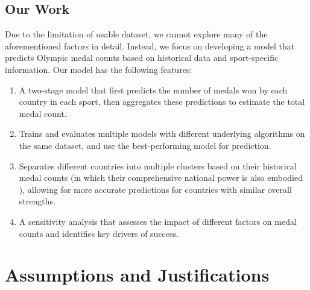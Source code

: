 \documentclass{mcmthesis}
\begin{document}
\subsection{Our Work}

Due to the limitation of usable dataset, we cannot explore many of the aforementioned factors in detail. Instead, we focus on developing a model that predicts Olympic medal counts based on historical data and sport-specific information. Our model has the following features:

\begin{enumerate}
    \item A two-stage model that first predicts the number of medals won by each country in each sport, then aggregates these predictions to estimate the total medal count.
    \item Trains and evaluates multiple models with different underlying algorithms on the same dataset, and use the best-performing model for prediction.
    \item Separates different countries into multiple clusters based on their historical medal counts (in which their comprehensive national power is also embodied \cite{7}), allowing for more accurate predictions for countries with similar overall strengths.
    \item A sensitivity analysis that assesses the impact of different factors on medal counts and identifies key drivers of success. 
\end{enumerate}

\section{Assumptions and Justifications} 
\end{document}
